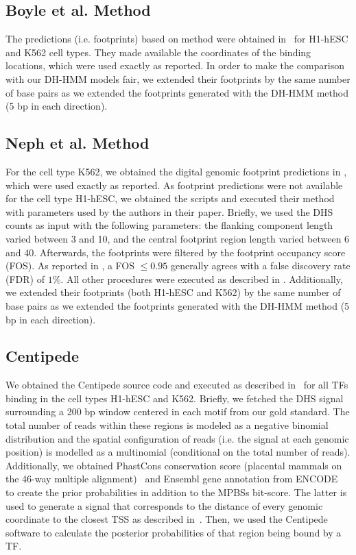 \documentclass{bioinfo}
\begin{document}
\subsection{Boyle et al. Method}
\label{sec:boyle}

The predictions (i.e. footprints) based on \cite{boyle2011} method were
obtained in~\cite{furey2013} for H1-hESC and K562 cell types. They made
available the coordinates of the binding locations, which were used exactly
as reported. In order to make the comparison with our DH-HMM models fair,
we extended their footprints by the same number of base pairs as we extended
the footprints generated with the DH-HMM method (5 bp in each direction).

\subsection{Neph et al. Method}
\label{sec:neph}

For the cell type K562, we obtained the digital genomic footprint predictions
in \cite{neph2012a}, which were used exactly as reported. As footprint predictions
were not available for the cell type H1-hESC, we obtained the scripts and executed
their method with parameters used by the authors in their paper. Briefly, we used
the DHS counts as input with the following parameters: the flanking component length
varied between 3 and 10, and the central footprint region length varied between
6 and 40. Afterwards, the footprints were filtered by the footprint occupancy score
(FOS). As reported in \cite{neph2012a}, a FOS $ \leq 0.95 $ generally agrees with a
false discovery rate (FDR) of $1\%$. All other procedures were executed as described
in \cite{neph2012a}. Additionally, we extended their footprints (both H1-hESC and
K562) by the same number of base pairs as we extended the footprints generated with
the DH-HMM method (5 bp in each direction).

\subsection{Centipede}
\label{sec:centipede}

We obtained the Centipede source code and executed as described
in~\cite{pique2011} for all TFs binding in the cell types H1-hESC and K562.
Briefly, we fetched the DHS signal surrounding a 200 bp window centered
in each motif from our gold standard. The total number of reads within these
regions is modeled as a negative binomial distribution and the spatial
configuration of reads (i.e. the signal at each genomic position) is modelled
as a multinomial (conditional on the total number of reads). Additionally, we
obtained PhastCons conservation score (placental mammals on the 46-way multiple
alignment)~\citep{siepel2005} and Ensembl gene annotation from ENCODE~\citep{hubbard2002}
to create the prior probabilities in addition to the MPBSs bit-score. The latter
is used to generate a signal that corresponds to the distance of every genomic
coordinate to the closest TSS as described in~\citep{pique2011}. Then, we used
the Centipede software to calculate the posterior probabilities of that region
being bound by a TF.
\end{document}
